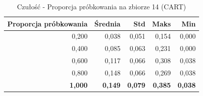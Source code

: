 \begin{table}[htbp]
\centering
\small
\setlength{\tabcolsep}{6pt}
\renewcommand{\arraystretch}{1.2}
\caption{Czułość - Proporcja próbkowania na zbiorze 14 (CART)}
\label{tab:CART_sample_ratio_14_recall}
\begin{tabular}{r|r|r|r|r}
\toprule
Proporcja próbkowania & Średnia & Std & Maks & Min \\
\hline
0,200 & 0,038 & 0,051 & 0,154 & 0,000 \\
0,400 & 0,085 & 0,063 & 0,231 & 0,000 \\
0,600 & 0,117 & 0,066 & 0,308 & 0,038 \\
0,800 & 0,148 & 0,066 & 0,269 & 0,038 \\
\textbf{1,000} & \textbf{0,149} & \textbf{0,079} & \textbf{0,385} & \textbf{0,038} \\
\bottomrule
\end{tabular}
\end{table}